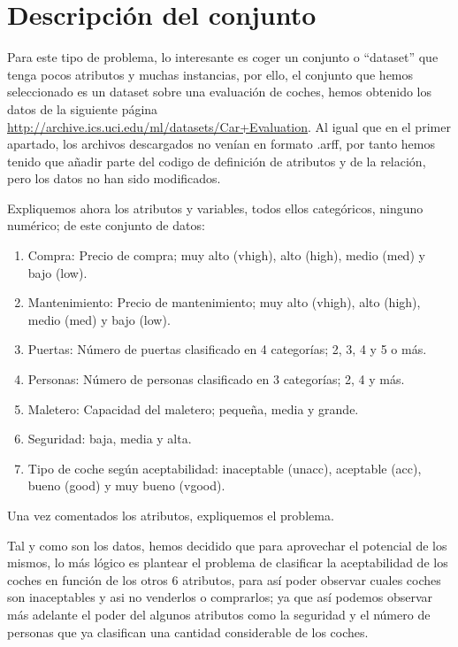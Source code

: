 \documentclass[a4paper, 11pt, twoside, openany, onecolumn, final]{memoir}
\begin{document}
		\section{Descripción del conjunto}
		Para este tipo de problema, lo interesante es coger un conjunto o ``dataset'' que tenga pocos atributos y muchas instancias, por ello, el conjunto que hemos seleccionado es un dataset sobre una evaluación de coches, hemos obtenido los datos de la siguiente página \url{http://archive.ics.uci.edu/ml/datasets/Car+Evaluation}. Al igual que en el primer apartado, los archivos descargados no venían en formato .arff, por tanto hemos tenido que añadir parte del codigo de definición de atributos y de la relación, pero los datos no han sido modificados.
		
		Expliquemos ahora los atributos y variables, todos ellos categóricos, ninguno numérico; de este conjunto de datos:
	
	\begin{enumerate}
\item Compra: Precio de compra; muy alto (vhigh), alto (high), medio (med) y bajo (low).
\item Mantenimiento: Precio de mantenimiento; muy alto (vhigh), alto (high), medio (med) y bajo (low).
\item Puertas: Número de puertas clasificado en 4 categorías; 2, 3, 4 y 5 o más.
\item Personas: Número de personas clasificado en 3 categorías; 2, 4 y más.
\item Maletero: Capacidad del maletero; pequeña, media y grande.
\item Seguridad: baja, media y alta. 
\item Tipo de coche según aceptabilidad: inaceptable (unacc), aceptable (acc), bueno (good) y muy bueno (vgood). 
\end{enumerate}
		
		Una vez comentados los atributos, expliquemos el problema. 

Tal y como son los datos, hemos decidido que para aprovechar el potencial de los mismos, lo más lógico es plantear el problema de clasificar la aceptabilidad de los coches en función de los otros 6 atributos, para así poder observar cuales coches son inaceptables y asi no venderlos o comprarlos; ya que así podemos observar más adelante el poder del algunos atributos como la seguridad y el número de personas que ya clasifican una cantidad considerable de los coches.
\end{document}
